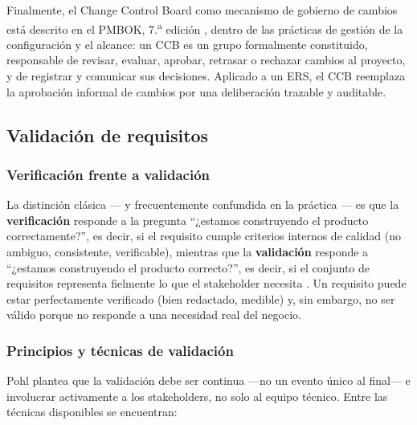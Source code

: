 \documentclass[11pt,a4paper]{article}
\begin{document}
Finalmente, el Change Control Board como mecanismo de gobierno de cambios
está descrito en el PMBOK, 7.\textsuperscript{a} edición
\cite{pmbok7}, dentro de las prácticas de gestión de la configuración y el
alcance: un CCB es un grupo formalmente constituido, responsable de
revisar, evaluar, aprobar, retrasar o rechazar cambios al proyecto, y de
registrar y comunicar sus decisiones. Aplicado a un ERS, el CCB reemplaza
la aprobación informal de cambios por una deliberación trazable y
auditable.

\subsection{Validación de requisitos}
\subsubsection{Verificación frente a validación}
 
La distinción clásica --- y frecuentemente confundida en la práctica --- es
que la \textbf{verificación} responde a la pregunta ``¿estamos construyendo
el producto correctamente?'', es decir, si el requisito cumple criterios
internos de calidad (no ambiguo, consistente, verificable), mientras que la
\textbf{validación} responde a ``¿estamos construyendo el producto
correcto?'', es decir, si el conjunto de requisitos representa fielmente
lo que el stakeholder necesita \cite{iso29148_2018, pohl2025}. Un requisito
puede estar perfectamente verificado (bien redactado, medible) y, sin
embargo, no ser válido porque no responde a una necesidad real del negocio.
 
\subsubsection{Principios y técnicas de validación}
 
Pohl \cite{pohl2025} plantea que la validación debe ser continua ---no un
evento único al final--- e involucrar activamente a los stakeholders, no
solo al equipo técnico. Entre las técnicas disponibles se encuentran:
 
\end{document}
